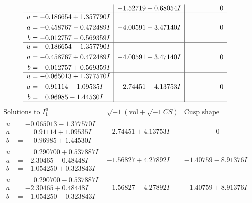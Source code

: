 \documentclass[1p]{elsarticle_modified}
\theoremstyle{definition}
\newcommand{\I}{\sqrt{-1}}
\begin{document}
$$\begin{array}{c|c|c}
 & -1.52719 + 0.68054 I & \phantom{-0.000000 } 0 \\ \hline\begin{aligned}
u &= -0.186654 + 1.357790 I \\
a &= -0.458767 - 0.472489 I \\
b &= -0.012757 - 0.569359 I\end{aligned}
 & -4.00591 - 3.47140 I & \phantom{-0.000000 } 0 \\ \hline\begin{aligned}
u &= -0.186654 - 1.357790 I \\
a &= -0.458767 + 0.472489 I \\
b &= -0.012757 + 0.569359 I\end{aligned}
 & -4.00591 + 3.47140 I & \phantom{-0.000000 } 0 \\ \hline\begin{aligned}
u &= -0.065013 + 1.377570 I \\
a &= \phantom{-}0.91114 - 1.09535 I \\
b &= \phantom{-}0.96985 - 1.44530 I\end{aligned}
 & -2.74451 - 4.13753 I & \phantom{-0.000000 } 0\\
 \hline 
 \end{array}$$\newpage$$\begin{array}{c|c|c}  
\text{Solutions to }I^u_{1}& \I (\text{vol} + \sqrt{-1}CS) & \text{Cusp shape}\\
 \hline 
\begin{aligned}
u &= -0.065013 - 1.377570 I \\
a &= \phantom{-}0.91114 + 1.09535 I \\
b &= \phantom{-}0.96985 + 1.44530 I\end{aligned}
 & -2.74451 + 4.13753 I & \phantom{-0.000000 } 0 \\ \hline\begin{aligned}
u &= \phantom{-}0.290700 + 0.537887 I \\
a &= -2.30465 - 0.48448 I \\
b &= -1.054250 + 0.323843 I\end{aligned}
 & -1.56827 + 4.27892 I & -1.40759 - 8.91376 I \\ \hline\begin{aligned}
u &= \phantom{-}0.290700 - 0.537887 I \\
a &= -2.30465 + 0.48448 I \\
b &= -1.054250 - 0.323843 I\end{aligned}
 & -1.56827 - 4.27892 I & -1.40759 + 8.91376 I \\ \hline\begin{aligned}

\end{aligned}
\end{array}$$
\end{document}

